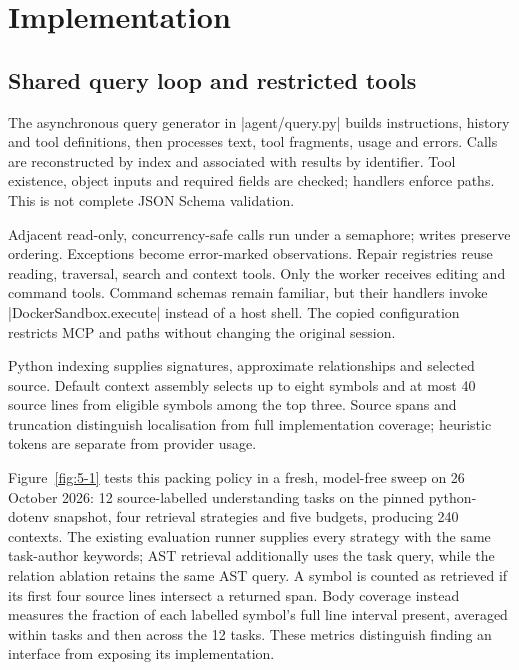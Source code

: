 \chapter{Implementation}\label{chap:5}

\section{Shared query loop and restricted tools}\label{sec:5.1}

The asynchronous query generator in \code|agent/query.py| builds instructions, history and tool definitions, then processes text, tool fragments, usage and errors. Calls are reconstructed by index and associated with results by identifier. Tool existence, object inputs and required fields are checked; handlers enforce paths. This is not complete JSON Schema validation.

Adjacent read-only, concurrency-safe calls run under a semaphore; writes preserve ordering. Exceptions become error-marked observations. Repair registries reuse reading, traversal, search and context tools. Only the worker receives editing and command tools. Command schemas remain familiar, but their handlers invoke \code|DockerSandbox.execute| instead of a host shell. The copied configuration restricts MCP and paths without changing the original session.

Python indexing supplies signatures, approximate relationships and selected source. Default context assembly selects up to eight symbols and at most 40 source lines from eligible symbols among the top three. Source spans and truncation distinguish localisation from full implementation coverage; heuristic tokens are separate from provider usage.

Figure~\ref{fig:5-1} tests this packing policy in a fresh, model-free sweep on 26 October 2026: 12 source-labelled understanding tasks on the pinned python-dotenv snapshot, four retrieval strategies and five budgets, producing 240 contexts. The existing evaluation runner supplies every strategy with the same task-author keywords; AST retrieval additionally uses the task query, while the relation ablation retains the same AST query. A symbol is counted as retrieved if its first four source lines intersect a returned span. Body coverage instead measures the fraction of each labelled symbol's full line interval present, averaged within tasks and then across the 12 tasks. These metrics distinguish finding an interface from exposing its implementation.

